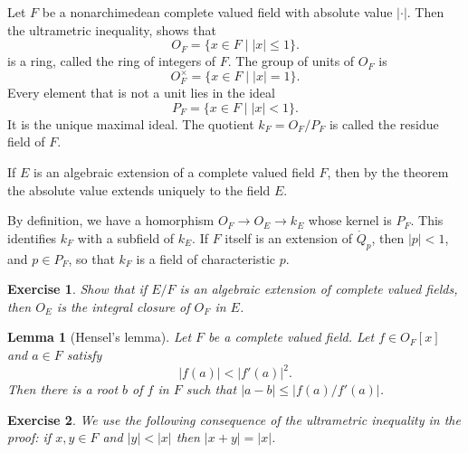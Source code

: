 \documentclass{amsart}
\newtheorem{lemma}[equation]{Lemma}
\newtheorem{exercise}{Exercise}
\def\abs#1{{|#1|}}
\begin{document}
Let $F$ be a nonarchimedean complete valued field with absolute value $\abs{\cdot}$.
Then the ultrametric inequality, shows that
\[
O_F = \{x\in F \mid \abs{x}\le 1\}.
\]
is a ring, called the ring of integers of $F$.  
The group of units of $O_F$ is
\[
O^\times_F = \{x \in F \mid \abs{x}=1\}.
\]
Every element that is not a unit lies in the ideal
\[
P_F = \{x \in F \mid \abs{x}<1\}.
\]
It is the unique maximal ideal.  The quotient
$k_F = O_F/P_F$ is called the residue field of $F$.

If $E$ is an algebraic extension of a complete valued field $F$, 
then by the theorem the absolute
value extends uniquely to the field $E$.

By definition, we have a homorphism
$O_F \to O_E \to k_E$
whose kernel is $P_F$.  This identifies $k_F$ with a subfield of $k_E$.
If  $F$ itself is an extension of $\ring{Q}_p$, then $\abs{p}<1$, and $p\in P_F$,
so that $k_F$ is a field of  characteristic $p$.

\begin{exercise} Show that if $E/F$ is an algebraic extension of
  complete valued fields, then $O_E$ is the integral closure of $O_F$
  in $E$.
\end{exercise}

\begin{lemma}[Hensel's lemma] Let $F$ be a complete valued field.
Let $f\in O_F[x]$ and $a\in F$ satisfy
\[
\abs{f(a)} < \abs{f'(a)}^2. 
\]
Then there is a root $b$ of $f$ in $F$ such that $\abs{a-b}\le\abs{f(a)/f'(a)}$.
\end{lemma}

\begin{exercise}  We use the following consequence
of the ultrametric inequality in the proof: if $x,y\in F$
and $\abs{y}<\abs{x}$ then $\abs{x + y}  = \abs{x}$.
\end{exercise}
\end{document}
